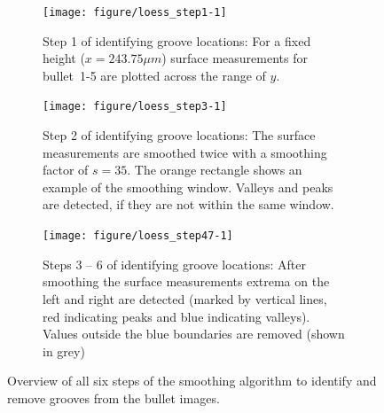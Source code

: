\documentclass[aoas, preprint]{imsart}\usepackage[]{graphicx}\usepackage[]{color}
\newenvironment{knitrout}{}{} %
\begin{document}
\begin{figure}[hbtp]
  \centering
\begin{subfigure}[t]{\textwidth}\centering
\caption{\label{fig:loess_step1}Step 1 of identifying groove locations: For a fixed height ($x = 243.75\mu m$)  surface measurements for bullet~1-5 are plotted across the range of $y$.}
\begin{knitrout}
\color{fgcolor}
\texttt{[image: figure/loess\_step1-1]} 

\end{knitrout}
\end{subfigure}
\begin{subfigure}[t]{\textwidth}\centering
\caption{\label{fig:loess_step3}Step 2 of identifying groove locations: The  surface measurements are smoothed twice with a smoothing factor of $s = 35$. The orange rectangle shows an example of the smoothing window. Valleys and peaks are detected, if they are not within the same window.}
\begin{knitrout}
\color{fgcolor}
\texttt{[image: figure/loess\_step3-1]} 

\end{knitrout}
\end{subfigure}
\begin{subfigure}[t]{\textwidth}\centering
\caption{\label{fig:loess_step47}Steps 3 -- 6 of identifying groove locations: After smoothing the surface measurements extrema on the left and right are detected (marked by vertical lines, red indicating peaks and blue indicating valleys). Values outside the blue boundaries are removed (shown in grey)}
\begin{knitrout}
\color{fgcolor}
\texttt{[image: figure/loess\_step47-1]} 

\end{knitrout}
\end{subfigure}
\caption{Overview of all six steps of the smoothing algorithm to identify and remove grooves from the bullet images.}
\end{figure}
\end{document}
